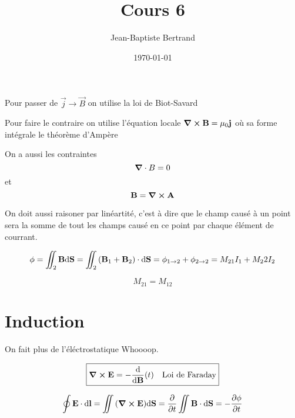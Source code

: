 \documentclass{article}
\title{Cours 6}
\author{Jean-Baptiste Bertrand}
\date{\today}
\begin{document}
\maketitle

Pour passer de $\vec j \to \vec B$ on utilise la loi de Biot-Savard

Pour faire le contraire on utilise l'équation locale $\grad \cross \vb B = \mu_0\vb j$
où sa forme intégrale le théorème d'Ampère

On a aussi les contraintes $$\grad \cdot B = 0$$ et $$\vb B = \grad \cross \vb A$$

On doit aussi raisoner par linéartité, c'est à dire que le champ causé à un point sera la somme de tout les champs causé en ce point par chaque élément de courrant.


$$\phi = \iint_2 \vb B \dd \vb S = \iint_2 \qty(\vb B_1 + \vb B_2) \cdot \dd \vb S = \phi_{1\to2} + \phi_{2\to2} = M_{21} I_1 + M_22 I_2$$

$$M_{21} = M_{12}$$

\section{Induction}

On fait plus de l'éléctrostatique Whoooop.

$$\boxed{\grad \cross \vb E = -\dv{\vb B}(t) \quad \text{Loi de Faraday}}$$

$$\oint \vb E \cdot \dd \vb l = \iint  \qty(\grad \cross \vb E) \dd \vb S = \pdv{t}\iint \vb B \cdot \dd \vb S = -\pdv{\phi}{t}$$
\end{document}
